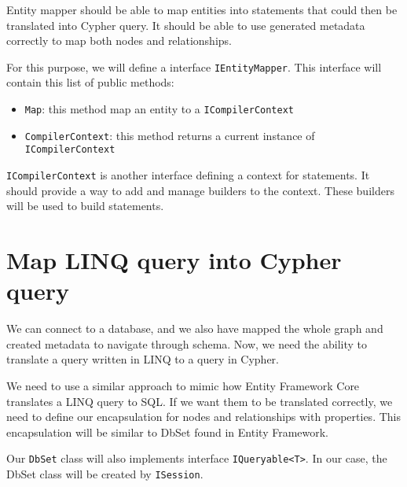 Entity mapper should be able to map entities into statements that could then be translated into Cypher query. It should be able to use generated metadata correctly
to map both nodes and relationships.

For this purpose, we will define a interface \texttt{IEntityMapper}. This interface will contain
this list of public methods:

\begin{itemize}
    \item {\texttt{Map}: this method map an entity to a \texttt{ICompilerContext}}
    \item {\texttt{CompilerContext}: this method returns a current instance of \texttt{ICompilerContext}}
\end{itemize}

\texttt{ICompilerContext} is another interface defining a context for statements. It should provide a way to add and manage builders to the context.
These builders will be used to build statements.

\section {Map LINQ query into Cypher query}

We can connect to a database, and we also have mapped the whole graph and created metadata to navigate through schema. Now, we need the ability to translate a query written in LINQ to a query in Cypher.

We need to use a similar approach to mimic how Entity Framework Core translates a LINQ query to SQL. If we want them to be translated correctly,
we need to define our encapsulation for nodes and relationships with properties. This encapsulation will be similar to DbSet found in Entity Framework.

Our \texttt{DbSet} class will also implements interface \texttt{IQueryable<T>}. In our case, the DbSet class will be created by \texttt{ISession}.

